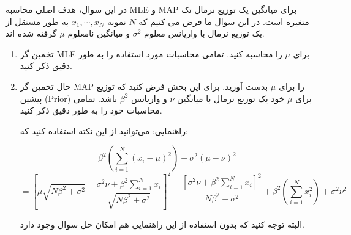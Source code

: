 در این سوال، هدف اصلی محاسبه MLE و MAP برای میانگین یک توزیع نرمال تک متغیره است. در این سوال ما فرض می کنیم که $N$ نمونه $x_1,\cdots,x_N$ به طور مستقل از یک توزیع نرمال با واریانس معلوم $\sigma^2$ و میانگین نامعلوم $\mu$ گرفته شده اند.

\begin{enumerate}
	\item تخمین گر MLE برای $\mu$ را محاسبه کنید. تمامی محاسبات مورد استفاده را به طور دقیق ذکر کنید.
	
	\item حال تخمین گر MAP را برای $\mu$ بدست آورید. برای این بخش فرض کنید که توزیع پیشین (Prior) برای $\mu$ خود یک توزیع نرمال با میانگین $\nu$ و واریانس $\beta^2$ باشد. تمامی محاسبات خود را به طور دقیق ذکر کنید. 
	
	راهنمایی: می‌توانید از این نکته استفاده کنید که:
	
	$$
	\beta^{2}\left(\sum_{i=1}^{N}\left(x_{i}-\mu\right)^{2}\right)+\sigma^{2}(\mu-\nu)^{2}$$
	$$
	=\left[\mu \sqrt{N \beta^{2}+\sigma^{2}}-\frac{\sigma^{2} \nu+\beta^{2} \sum_{i=1}^{N} x_{i}}{\sqrt{N \beta^{2}+\sigma^{2}}}\right]^{2}-\frac{\left[\sigma^{2} \nu+\beta^{2} \sum_{i=1}^{N} x_{i}\right]^{2}}{N \beta^{2}+\sigma^{2}}+\beta^{2}\left(\sum_{i=1}^{N} x_{i}^{2}\right)+\sigma^{2} \nu^{2}
	$$	
	
	البته توجه کنید که بدون استفاده از این راهنمایی هم امکان حل سوال وجود دارد.
\end{enumerate}